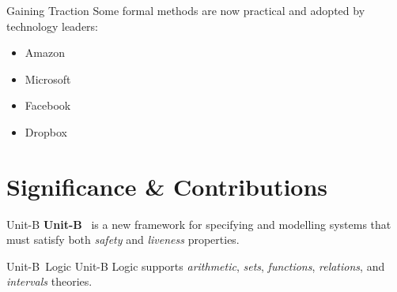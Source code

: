 \documentclass[11pt]{beamer}
\newcommand{\unitb}{Unit-B\xspace}
\begin{document}
\begin{frame}[fragile]{Gaining Traction}
  Some formal methods are now practical and adopted by technology leaders:
  \begin{itemize}
  \item Amazon
  \item Microsoft
  \item Facebook
  \item Dropbox
  \end{itemize}
\end{frame}


\section{Significance \& Contributions}

\begin{frame}[fragile]{\unitb}
  \textbf{\unitb}~\cite{SoSyM/Hudon/Hoang/Ostroff15} is a new
  framework for specifying and modelling systems that must satisfy
  both \emph{safety} and \emph{liveness} properties.
\end{frame}

\begin{frame}{\unitb\ Logic}
  \unitb Logic supports \emph{arithmetic}, \emph{sets}, \emph{functions},
  \emph{relations}, and \emph{intervals} theories.
\end{frame}
\end{document}
